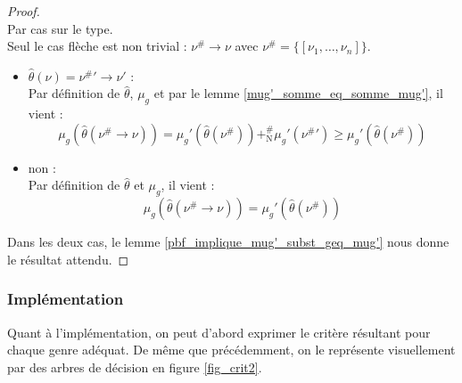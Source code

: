 \documentclass[a4paper]{report}
\newenvironment{preuve} 
  {\begin{proof}~\\} 
  {\end{proof}}
\theoremstyle{definition}
\newcommand{\mset}[1]{\{\![#1]\!\}}
\newcommand{\N}{\mathrm{N}}
\begin{document}
\begin{preuve}
  Par cas sur le type. \\
  Seul le cas flèche est non trivial : $\nu^\# \rightarrow \nu$ avec $\nu^\# = \mset{\nu_1, \dots, \nu_n}$.
  \begin{itemize}[label={\textbf{Si}}]
    \item
      $\hat\theta (\nu) = {\nu^\#}' \rightarrow \nu'$ : \\
      Par définition de $\hat\theta$, $\mu_g$ et par le lemme \ref{mug'_somme_eq_somme_mug'}, il vient :
      \[ \mu_g (\hat\theta (\nu^\# \rightarrow \nu)) = \mu_g' (\hat\theta (\nu^\#)) +^\#_\N \mu_g' ({\nu^\#}') \geqslant \mu_g' (\hat\theta (\nu^\#)) \]
    \item
      non : \\
      Par définition de $\hat\theta$ et $\mu_g$, il vient :
      \[ \mu_g (\hat\theta (\nu^\# \rightarrow \nu)) = \mu_g' (\hat\theta (\nu^\#)) \]
  \end{itemize}
  Dans les deux cas, le lemme \ref{pbf_implique_mug'_subst_geq_mug'} nous donne le résultat attendu.
\end{preuve}

\subsubsection{Implémentation}

Quant à l'implémentation, on peut d'abord exprimer le critère résultant pour chaque genre adéquat. De même que précédemment, on le représente visuellement par des arbres de décision en figure \ref{fig_crit2}.
\end{document}

